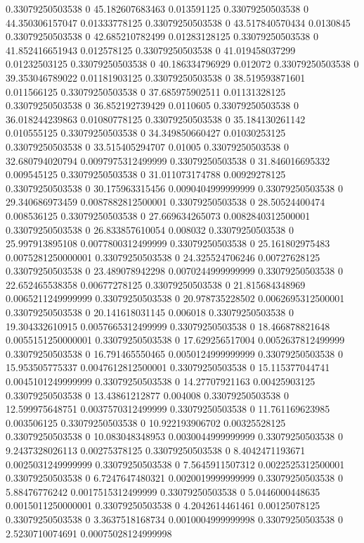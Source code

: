 0.33079250503538 0 45.182607683463 0.013591125
0.33079250503538 0 44.350306157047 0.01333778125
0.33079250503538 0 43.517840570434 0.0130845
0.33079250503538 0 42.685210782499 0.01283128125
0.33079250503538 0 41.852416651943 0.012578125
0.33079250503538 0 41.019458037299 0.01232503125
0.33079250503538 0 40.186334796929 0.012072
0.33079250503538 0 39.353046789022 0.01181903125
0.33079250503538 0 38.519593871601 0.011566125
0.33079250503538 0 37.685975902511 0.01131328125
0.33079250503538 0 36.852192739429 0.0110605
0.33079250503538 0 36.018244239863 0.01080778125
0.33079250503538 0 35.184130261142 0.010555125
0.33079250503538 0 34.349850660427 0.01030253125
0.33079250503538 0 33.515405294707 0.01005
0.33079250503538 0 32.680794020794 0.0097975312499999
0.33079250503538 0 31.846016695332 0.009545125
0.33079250503538 0 31.011073174788 0.00929278125
0.33079250503538 0 30.175963315456 0.0090404999999999
0.33079250503538 0 29.340686973459 0.0087882812500001
0.33079250503538 0 28.50524400474 0.008536125
0.33079250503538 0 27.669634265073 0.0082840312500001
0.33079250503538 0 26.833857610054 0.008032
0.33079250503538 0 25.997913895108 0.0077800312499999
0.33079250503538 0 25.161802975483 0.0075281250000001
0.33079250503538 0 24.325524706246 0.00727628125
0.33079250503538 0 23.489078942298 0.0070244999999999
0.33079250503538 0 22.652465538358 0.00677278125
0.33079250503538 0 21.815684348969 0.0065211249999999
0.33079250503538 0 20.978735228502 0.0062695312500001
0.33079250503538 0 20.141618031145 0.006018
0.33079250503538 0 19.304332610915 0.0057665312499999
0.33079250503538 0 18.466878821648 0.0055151250000001
0.33079250503538 0 17.629256517004 0.0052637812499999
0.33079250503538 0 16.791465550465 0.0050124999999999
0.33079250503538 0 15.953505775337 0.0047612812500001
0.33079250503538 0 15.115377044741 0.0045101249999999
0.33079250503538 0 14.27707921163 0.00425903125
0.33079250503538 0 13.43861212877 0.004008
0.33079250503538 0 12.599975648751 0.0037570312499999
0.33079250503538 0 11.761169623985 0.003506125
0.33079250503538 0 10.922193906702 0.00325528125
0.33079250503538 0 10.083048348953 0.0030044999999999
0.33079250503538 0 9.2437328026113 0.00275378125
0.33079250503538 0 8.4042471193671 0.0025031249999999
0.33079250503538 0 7.5645911507312 0.0022525312500001
0.33079250503538 0 6.7247647480321 0.0020019999999999
0.33079250503538 0 5.88476776242 0.0017515312499999
0.33079250503538 0 5.0446000448635 0.0015011250000001
0.33079250503538 0 4.2042614461461 0.00125078125
0.33079250503538 0 3.3637518168734 0.0010004999999998
0.33079250503538 0 2.5230710074691 0.00075028124999998
